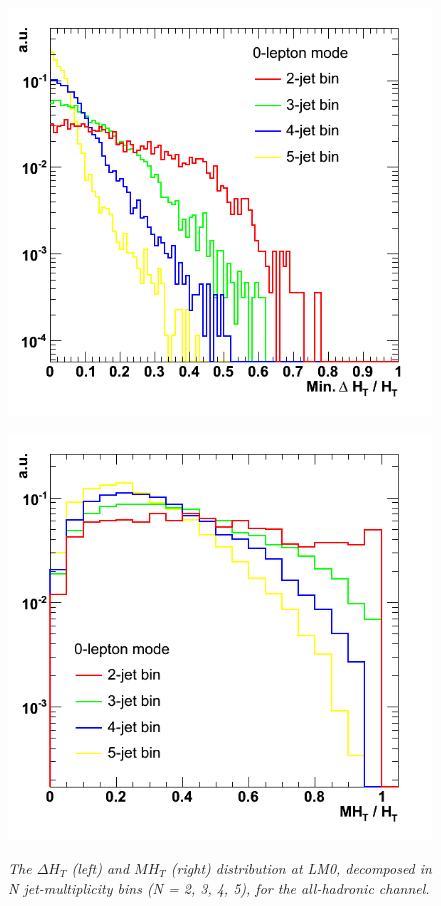 \begin{figure}[h!]
\begin{minipage}[b]{0.5\linewidth}
\centering
{\label{fig:lm1_cor}\includegraphics[scale=0.36]{./plots/dht_njet.png}}
\end{minipage}
\begin{minipage}[b]{0.5\linewidth}
\centering
{\label{fig:qcd_cor}\includegraphics[scale=0.36]{./plots/mht_njet.png}}
\end{minipage}
\caption{\textit{The $\Delta H_{T}$ (left) and $MH_{T}$ (right) distribution at LM0, decomposed in N jet-multiplicity bins (N = 2, 3, 4, 5), for the all-hadronic channel.} }
\label{fig:obj-mult}
\end{figure}

